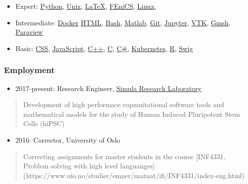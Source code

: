 \documentclass[11pt, a4paper]{article}
\providecommand{\tightlist}{%
  \setlength{\itemsep}{0pt}\setlength{\parskip}{0pt}}
\begin{document}
\begin{raggedright}
\begin{itemize}
\tightlist
\item
  Expert: \href{https://www.python.org}{Python},
  \href{https://en.wikipedia.org/wiki/Unix}{Unix},
  \href{https://www.latex-project.org}{LaTeX},
  \href{https://fenicsproject.org}{FEniCS},
  \href{https://en.wikipedia.org/wiki/Linux}{Linux},
\item
  Intermediate: \href{https://www.docker.com}{Docker}
  \href{https://en.wikipedia.org/wiki/HTML}{HTML},
  \href{https://en.wikipedia.org/wiki/Bash_(Unix_shell)}{Bash},
  \href{https://se.mathworks.com/products/matlab.html}{Matlab},
  \href{https://git-scm.com}{Git}, \href{http://jupyter.org}{Jupyter},
  \href{https://www.vtk.org}{VTK}, \href{http://gmsh.info}{Gmsh},
  \href{https://www.paraview.org}{Paraview}
\item
  Basic:
  \href{https://en.wikipedia.org/wiki/Cascading_Style_Sheets}{CSS},
  \href{https://en.wikipedia.org/wiki/JavaScript}{JavaScript},
  \href{https://en.wikipedia.org/wiki/C\%2B\%2B}{C++},
  \href{https://en.wikipedia.org/wiki/C_(programming_language)}{C},
  \href{https://en.wikipedia.org/wiki/C_Sharp_(programming_language)}{C\#},
  \href{https://kubernetes.io}{Kubernetes},
  \href{https://www.r-project.org/about.html}{R},
  \href{http://www.swig.org}{Swig}
\end{itemize}

\hypertarget{employment}{%
\subsubsection{Employment}\label{employment}}

\begin{itemize}
\tightlist
\item
  2017-present: Research Engineer, \href{https://www.simula.no}{Simula
  Research Laboratory}
\end{itemize}

\begin{quote}
Development of high performace copmuitational software tools and
mathematical models for the study of Human Induced Pluripotent Stem
Cells (hiPSC)
\end{quote}

\begin{itemize}
\tightlist
\item
  2016: Corrector, University of Oslo
\end{itemize}

\begin{quote}
Correcting assignments for master students in the course {[}INF4331,
Problem solving with high level languanges{]}
(https://www.uio.no/studier/emner/matnat/ifi/INF4331/index-eng.html)
\end{quote}


\end{raggedright}
\end{document}
